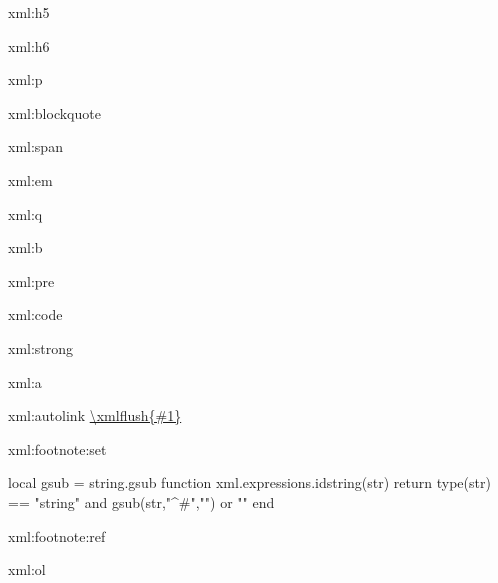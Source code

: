 \startxmlsetups xml:h5
\stopxmlsetups

\startxmlsetups xml:h6
\stopxmlsetups

\startxmlsetups xml:p
     {
        \dontleavehmode
        \ignorespaces
        \removeunwantedspaces
    }
    \par
\stopxmlsetups

\startxmlsetups xml:blockquote
    \startnarrow{}\stopnarrow
\stopxmlsetups

\startxmlsetups xml:span
   \begingroup{}\endgroup
\stopxmlsetups

\startxmlsetups xml:em
    \begingroup\em {}\endgroup
\stopxmlsetups

\startxmlsetups xml:q
\stopxmlsetups

\startxmlsetups xml:b
    \begingroup\bf{}\endgroup
\stopxmlsetups

\startxmlsetups xml:pre
    \par
\stopxmlsetups

\startxmlsetups xml:code
    \begingroup\tt{}\endgroup
\stopxmlsetups

\startxmlsetups xml:strong
    \begingroup\bf{}\endgroup
\stopxmlsetups

\startxmlsetups xml:a
    \href{\xmlatt{#1}{href}}{}
\stopxmlsetups

\startxmlsetups xml:autolink
    \url{\xmlflush{#1}}
\stopxmlsetups

\startxmlsetups xml:footnote:set
     \startfootnote
     \stopfootnote
\stopxmlsetups

\startluacode
     local gsub = string.gsub
     function xml.expressions.idstring(str)
         return type(str) == "string" and gsub(str,"^#","") or ""
     end
\stopluacode

\startxmlsetups xml:footnote:ref
\stopxmlsetups



\startxmlsetups xml:ol
    {\startitemize[n][start=\xmlatt{#1}{start}]
    \stopitemize}
    {\startitemize[n]
    \stopitemize}
\stopxmlsetups

